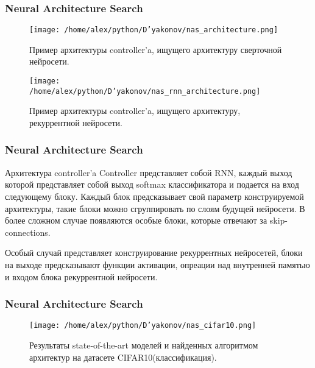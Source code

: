 \documentclass[fleqn, xcolor=x11names]{beamer}
\begin{document}
\begin{frame}\frametitle{Neural Architecture Search}

\begin{figure}[h]
\begin{center}
\texttt{[image: /home/alex/python/D'yakonov/nas\_architecture.png]}
\caption{Пример архитектуры controller'a, ищущего архитектуру сверточной нейросети.}
\end{center}
\end{figure}

\begin{figure}[h]
\begin{center}
\texttt{[image: /home/alex/python/D'yakonov/nas\_rnn\_architecture.png]}
\caption{Пример архитектуры controller'a, ищущего архитектуру, рекуррентной нейросети.}
\end{center}
\end{figure}


\end{frame}

\begin{frame}\frametitle{Neural Architecture Search}

\begin{block}{Архитектура controller'a}
Controller представляет собой RNN, каждый выход которой представляет собой выход softmax классификатора и подается на вход следующему блоку. Каждый блок предсказывает свой параметр конструируемой архитектуры, такие блоки можно сгруппировать по слоям будущей нейросети. В более сложном случае появляются особые блоки, которые отвечают за skip-connections.

Особый случай представляет конструирование рекуррентных нейросетей, блоки на выходе предсказывают функции активации, опреации над внутренней памятью и входом блока рекуррентной нейросети.
\end{block}

\end{frame}

\begin{frame}\frametitle{Neural Architecture Search}

\begin{figure}[h]
\begin{center}
\texttt{[image: /home/alex/python/D'yakonov/nas\_cifar10.png]}
\caption{Результаты state-of-the-art моделей и найденных алгоритмом архитектур на датасете CIFAR10(классификация).}
\end{center}
\end{figure}

\end{frame}
\end{document}
